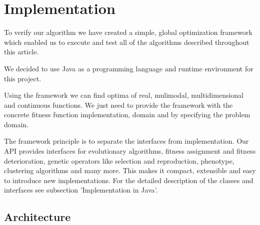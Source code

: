 

\chapter{Implementation}
\label{Implementation}
To verify our algorithm we have created a simple, global optimization framework
which enabled us to execute and test all of the algorithms described throughout
this article.

We decided to use Java \cite{java} as a programming language and runtime
environment for this project. 

Using the framework we can find optima of real, mulimodal, multidimensional and
continuous functions. We just need to provide the framework with the concrete
fitness function implementation, domain and by specifying the problem domain.

The framework principle is to separate the interfaces from implementation.
Our API provides interfaces for evolutionary algorithms, fitness assignment
and fitness deterioration, genetic operators like selection and reproduction,
phenotype, clustering algorithms and many more. This makes it compact,
extensible and easy to introduce new implementations.
For the detailed description of the classes and interfaces see subsection
'Implementation in Java'.  

\section{Architecture}

